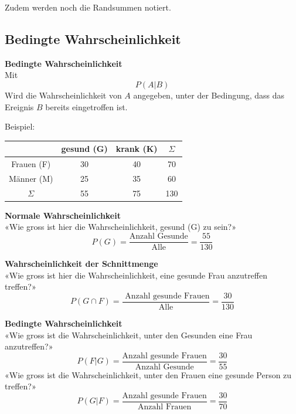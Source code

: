 \begin{multicols}{2}
Zudem werden noch die Randsummen notiert.



\subsection*{Bedingte Wahrscheinlichkeit}

\begin{tcolorbox}[colback=white]
  \textbf{Bedingte Wahrscheinlichkeit}\\
Mit
$$P(A|B)$$
Wird die Wahrscheinlichkeit von $A$ angegeben, unter der Bedingung,
dass das Ereignis $B$ bereits eingetroffen ist.
\end{tcolorbox}
%
\forceCB%

Beispiel:

\begin{tabular}{c|c|c|c}
           & gesund (G)& krank (K)& $\Sigma$ \\\hline
Frauen (F) &        30 &       40 &       70 \\\hline
Männer (M) &        25 &       35 &       60 \\\hline
$\Sigma$   &        55 &       75 &      130 \\\hline
 \end{tabular}

\textbf{Normale Wahrscheinlichkeit}\\
«Wie gross ist hier die Wahrscheinlichkeit, gesund (G) zu sein?»
$$P(G) = \frac{\textrm{Anzahl Gesunde}}{\textrm{Alle}} =  \frac{55}{130}$$

\textbf{Wahrscheinlichkeit der Schnittmenge}\\
«Wie gross ist hier die Wahrscheinlichkeit, eine gesunde Frau anzutreffen treffen?»
$$P(G\cap F) = \frac{\textrm{\ Anzahl gesunde Frauen}}{\textrm{Alle}}= \frac{30}{130}$$

\textbf{Bedingte Wahrscheinlichkeit}\\
«Wie gross ist die Wahrscheinlichkeit, unter den Gesunden eine Frau anzutreffen?»
$$P(F | G) = \frac{\textrm{Anzahl gesunde Frauen}}{\textrm{Anzahl Gesunde}} =  \frac{30}{55}$$
«Wie gross ist die Wahrscheinlichkeit, unter den Frauen eine gesunde Person zu treffen?»
$$P(G | F) = \frac{\textrm{Anzahl gesunde Frauen}}{\textrm{Anzahl Frauen}}=  \frac{30}{70}$$



\end{multicols}


\newpage

